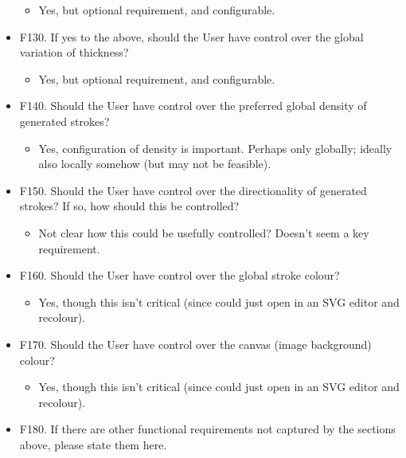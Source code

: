 \begin{itemize}
  \begin{itemize}
  \tightlist
  \item
    Yes, but optional requirement, and configurable.
  \end{itemize}
\item
  F130. If yes to the above, should the User have control over the
  global variation of thickness?

  \begin{itemize}
  \tightlist
  \item
    Yes, but optional requirement, and configurable.
  \end{itemize}
\item
  F140. Should the User have control over the preferred global density
  of generated strokes?

  \begin{itemize}
  \tightlist
  \item
    Yes, configuration of density is important. Perhaps only globally;
    ideally also locally somehow (but may not be feasible).
  \end{itemize}
\item
  F150. Should the User have control over the directionality of
  generated strokes? If so, how should this be controlled?

  \begin{itemize}
  \tightlist
  \item
    Not clear how this could be usefully controlled? Doesn't seem a key
    requirement.
  \end{itemize}
\item
  F160. Should the User have control over the global stroke colour?

  \begin{itemize}
  \tightlist
  \item
    Yes, though this isn't critical (since could just open in an SVG
    editor and recolour).
  \end{itemize}
\item
  F170. Should the User have control over the canvas (image background)
  colour?

  \begin{itemize}
  \tightlist
  \item
    Yes, though this isn't critical (since could just open in an SVG
    editor and recolour).
  \end{itemize}
\item
  F180. If there are other functional requirements not captured by the
  sections above, please state them here.


\end{itemize}
